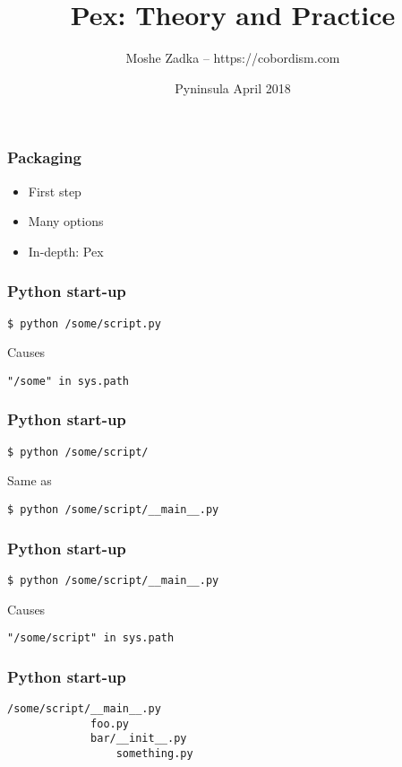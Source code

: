 \usepackage[utf8]{inputenc}
\usepackage{listings}

\title{Pex: Theory and Practice}
\author{Moshe Zadka -- https://cobordism.com}
\date{Pyninsula April 2018}
 

 
\frame{\titlepage}

\maketitle

\begin{frame}[fragile]
\frametitle{Packaging}
\begin{itemize}
\item First step
\item Many options
\item In-depth: Pex
\end{itemize}
\end{frame}

\begin{frame}[fragile]
\frametitle{Python start-up}
\begin{lstlisting}
$ python /some/script.py
\end{lstlisting}
Causes
\begin{lstlisting}
"/some" in sys.path
\end{lstlisting}
\end{frame}

\begin{frame}[fragile]
\frametitle{Python start-up}
\begin{lstlisting}
$ python /some/script/
\end{lstlisting}
Same as
\begin{lstlisting}
$ python /some/script/__main__.py
\end{lstlisting}
\end{frame}

\begin{frame}[fragile]
\frametitle{Python start-up}
\begin{lstlisting}
$ python /some/script/__main__.py
\end{lstlisting}
Causes
\begin{lstlisting}
"/some/script" in sys.path
\end{lstlisting}
\end{frame}

\begin{frame}[fragile]
\frametitle{Python start-up}
\begin{lstlisting}
/some/script/__main__.py
             foo.py
             bar/__init__.py
                 something.py
\end{lstlisting}
\end{frame}

